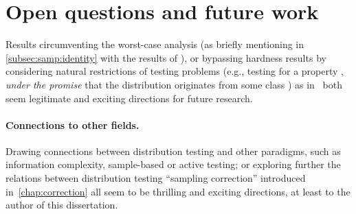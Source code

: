 \section*{Open questions and future work}
Results circumventing the worst-case analysis (as briefly mentioning in \autoref{subsec:samp:identity} with the results of \cite{ValiantValiant:14}), or bypassing hardness results by considering natural restrictions of testing problems (e.g., testing for a property \property, \emph{under the promise} that the distribution originates from some class \class) as in~\cite{DDSV:13,DKN:15,DKN:15:FOCS} both seem legitimate and exciting directions for future research.
\paragraph{Connections to other fields.} Drawing connections between distribution testing and other paradigms, such as information complexity, sample-based or active testing; or exploring further the relations between distribution testing ``sampling correction'' introduced in~\cref{chap:correction} all seem to be thrilling and exciting directions, at least to the author of this dissertation.
